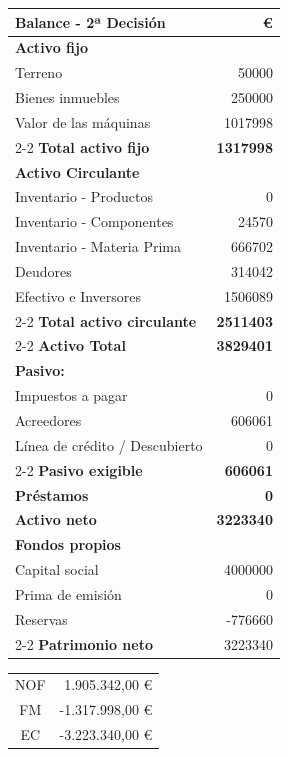 \begin{table}[h]
    \centering
    \begin{tabular}{lr}
        \textbf{Balance - 2ª Decisión}               & \textbf{€} \\
        \hline
        \textbf{Activo fijo}                & \\
        Terreno                             & 50000 \\
        Bienes inmuebles                    & 250000 \\
        Valor de las máquinas               & 1017998 \\
        \cline{2-2}
        \textbf{Total activo fijo}          & \textbf{1317998} \\
        \textbf{Activo Circulante}          & \\
        Inventario - Productos              & 0 \\
        Inventario - Componentes            & 24570 \\
        Inventario - Materia Prima          & 666702 \\
        Deudores                            & 314042 \\
        Efectivo e Inversores               & 1506089 \\
        \cline{2-2}
        \textbf{Total activo circulante}    & \textbf{2511403} \\
        \cline{2-2}
        \textbf{Activo Total}               & \textbf{3829401} \\
        \textbf{Pasivo:}                    & \\
        Impuestos a pagar                   & 0 \\
        Acreedores                          & 606061 \\
        Línea de crédito / Descubierto      & 0 \\
        \cline{2-2}
        \textbf{Pasivo exigible}            & \textbf{606061} \\
        \textbf{Préstamos}                  & \textbf{0} \\
        \textbf{Activo neto}                & \textbf{3223340} \\
        \textbf{Fondos propios}             & \\
        Capital social                      & 4000000 \\
        Prima de emisión                    & 0 \\
        Reservas                            & -776660 \\
        \cline{2-2}
        \textbf{Patrimonio neto}            & 3223340 
    \end{tabular}
\end{table}

\begin{table}[h]
    \centering
    \begin{tabular}{|c|r|}
        \hline
        NOF & 1.905.342,00 € \\
        FM & -1.317.998,00 € \\
        EC & -3.223.340,00 € \\
        \hline
    \end{tabular}
\end{table}